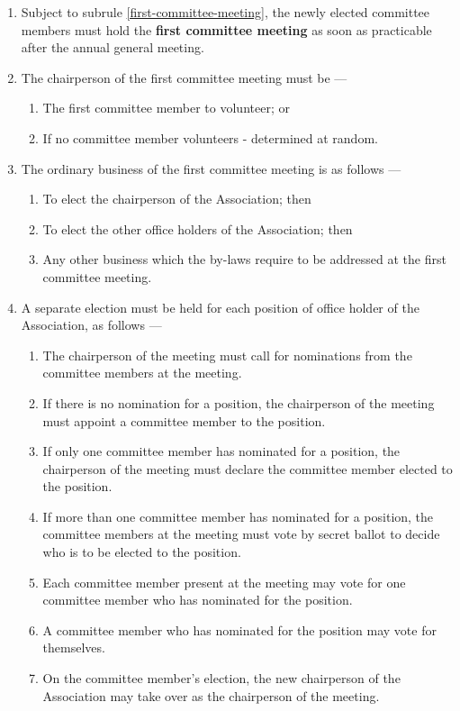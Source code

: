 \documentclass[../constitution.tex]{subfiles}
\begin{document}
\begin{enumerate}

  \item Subject to subrule \ref{first-committee-meeting}, the newly elected committee members must hold the \textbf{first committee meeting} as soon as practicable after the annual general meeting.

  \item The chairperson of the first committee meeting must be ---

        \begin{enumerate}
          \item The first committee member to volunteer; or
          \item If no committee member volunteers - determined at random.
        \end{enumerate}

  \item The ordinary business of the first committee meeting is as follows ---

        \begin{enumerate}
          \item To elect the chairperson of the Association; then
          \item To elect the other office holders of the Association; then
          \item Any other business which the by-laws require to be addressed at the first committee meeting.
        \end{enumerate}




  \item A separate election must be held for each position of office holder of the Association, as follows ---

        \begin{enumerate}
          \item The chairperson of the meeting must call for nominations from the committee members at the meeting.
          \item If there is no nomination for a position, the chairperson of the meeting must appoint a committee member to the position.
          \item If only one committee member has nominated for a position, the chairperson of the meeting must declare the committee member elected to the position.
          \item If more than one committee member has nominated for a position, the committee members at the meeting must vote by secret ballot to decide who is to be elected to the position.
          \item Each committee member present at the meeting may vote for one committee member who has nominated for the position.
          \item A committee member who has nominated for the position may vote for themselves.
          \item On the committee member's election, the new chairperson of the Association may take over as the chairperson of the meeting.
        \end{enumerate}

\end{enumerate}
\end{document}
